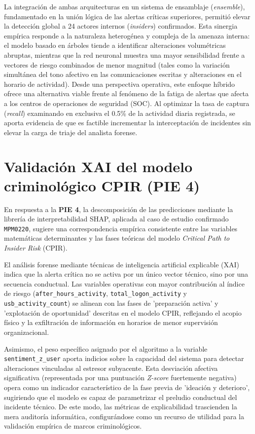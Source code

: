 \documentclass[IB]{TFUOC}%
\begin{document}
\medskip
\noindent La integración de ambas arquitecturas en un sistema de ensamblaje (\textit{ensemble}), fundamentado en la unión lógica de las alertas críticas superiores, permitió elevar la detección global a 24 actores internos (\textit{insiders}) confirmados. Esta sinergia empírica responde a la naturaleza heterogénea y compleja de la amenaza interna: el modelo basado en árboles tiende a identificar alteraciones volumétricas abruptas, mientras que la red neuronal muestra una mayor sensibilidad frente a vectores de riesgo combinados de menor magnitud (tales como la variación simultánea del tono afectivo en las comunicaciones escritas y alteraciones en el horario de actividad). Desde una perspectiva operativa, este enfoque híbrido ofrece una alternativa viable frente al fenómeno de la fatiga de alertas que afecta a los centros de operaciones de seguridad (SOC). Al optimizar la tasa de captura (\textit{recall}) examinando en exclusiva el 0.5\% de la actividad diaria registrada, se aporta evidencia de que es factible incrementar la interceptación de incidentes sin elevar la carga de triaje del analista forense.

\section{Validación XAI del modelo criminológico CPIR (PIE 4)}
En respuesta a la \textbf{PIE 4}, la descomposición de las predicciones mediante la librería de interpretabilidad SHAP, aplicada al caso de estudio confirmado \texttt{MPM0220}, sugiere una correspondencia empírica consistente entre las variables matemáticas determinantes y las fases teóricas del modelo \textit{Critical Path to Insider Risk} (CPIR).

\medskip
\noindent El análisis forense mediante técnicas de inteligencia artificial explicable (XAI) indica que la alerta crítica no se activa por un único vector técnico, sino por una secuencia conductual. Las variables operativas con mayor contribución al índice de riesgo (\texttt{after\_hours\_activity}, \texttt{total\_logon\_activity} y \texttt{usb\_activity\_count}) se alinean con las fases de 'preparación activa' y 'explotación de oportunidad' descritas en el modelo CPIR, reflejando el acopio físico y la exfiltración de información en horarios de menor supervisión organizacional. 

\medskip
\noindent Asimismo, el peso específico asignado por el algoritmo a la variable \texttt{sentiment\_z\_user} aporta indicios sobre la capacidad del sistema para detectar alteraciones vinculadas al estresor subyacente. Esta desviación afectiva significativa (representada por una puntuación \textit{Z-score} fuertemente negativa) opera como un indicador característico de la fase previa de 'ideación y deterioro', sugiriendo que el modelo es capaz de parametrizar el preludio conductual del incidente técnico. De este modo, las métricas de explicabilidad trascienden la mera auditoría informática, configurándose como un recurso de utilidad para la validación empírica de marcos criminológicos.
\end{document}
